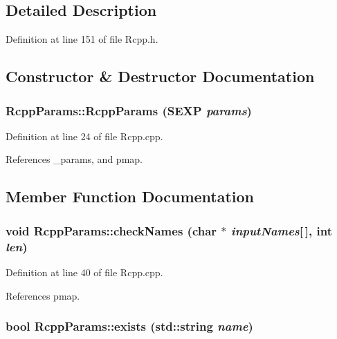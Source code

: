 \subsection{Detailed Description}


Definition at line 151 of file Rcpp.h.

\subsection{Constructor \& Destructor Documentation}
\hypertarget{classRcppParams_a7315d083ee0d1d0ca00c3aad0175d524}{
\subsubsection[{RcppParams}]{\setlength{\rightskip}{0pt plus 5cm}RcppParams::RcppParams (SEXP {\em params})}}
\label{classRcppParams_a7315d083ee0d1d0ca00c3aad0175d524}


Definition at line 24 of file Rcpp.cpp.

References \_\-params, and pmap.

\subsection{Member Function Documentation}
\hypertarget{classRcppParams_a1b8feaf39d3ffdf0f6773c44ac53736c}{
\subsubsection[{checkNames}]{\setlength{\rightskip}{0pt plus 5cm}void RcppParams::checkNames (char $\ast$ {\em inputNames}\mbox{[}$\,$\mbox{]}, \/  int {\em len})}}
\label{classRcppParams_a1b8feaf39d3ffdf0f6773c44ac53736c}


Definition at line 40 of file Rcpp.cpp.

References pmap.\hypertarget{classRcppParams_a989141ab2a8800b97d91bfb43420c6bc}{
\subsubsection[{exists}]{\setlength{\rightskip}{0pt plus 5cm}bool RcppParams::exists (std::string {\em name})}}
\label{classRcppParams_a989141ab2a8800b97d91bfb43420c6bc}


